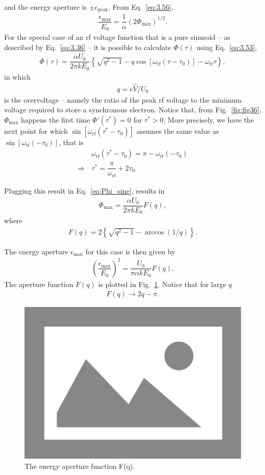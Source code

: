  and the energy aperture is $\pm\epsilon_\text{peak}$. From Eq.~\eqref{eq:3.56},
\begin{align}
	\dfrac{\epsilon_{\max}}{E_0} = \dfrac{1}{\alpha} (2 \Phi_{\max})^{1/2}.
\end{align}
For the special case of an rf voltage function that is a pure sinusoid -- as described by Eq.~\eqref{eq:3.36} -- it is possible to calculate $\Phi(\tau)$ using Eq.~\eqref{eq:3.53},
\begin{align}\label{eq:Phi_sine}
	\Phi(\tau) = \dfrac{\alpha U_0}{2\pi k E_0} \left\lbrace \sqrt{q^2-1} - q \cos [\omega_{\text{rf}}(\tau - \tau_0)] - \omega_{\text{rf}} \tau \right\rbrace,
\end{align}
in which 
\begin{align} \label{eq:3.60}
q = e\hat{V}/U_0
\end{align}
is the overvoltage -- namely the ratio of the peak rf voltage to the minimum voltage required to store a synchronous electron. Notice that, from Fig.~\ref{fig:fig36}, $\Phi_{\max}$ happens the first time $\Phi'(\tau^*) = 0$ for $\tau^* > 0$. More precisely, we have the next point for which $\sin[\omega_{\text{rf}}(\tau^*-\tau_0)]$ assumes the same value as $\sin[\omega_{\text{rf}}(-\tau_0)]$, that is
\begin{align*}
	& \omega_{\text{rf}}(\tau^* - \tau_0) = \pi - \omega_{\text{rf}}(-\tau_0) \\
    \Rightarrow \, & \tau^* = \dfrac{\pi}{\omega_{\text{rf}}} + 2\tau_0.
\end{align*}

Plugging this result in Eq.~\eqref{eq:Phi_sine}, results in
\begin{align} \label{eq:3.58}
	\Phi_{\max} = \dfrac{\alpha U_0}{2\pi k E_0} F(q),
\end{align}
where
\begin{align}
	F(q) = 2\left\lbrace \sqrt{q^2 - 1} - \arccos(1/q) \right\rbrace.
\end{align}

The energy aperture $\epsilon_{\max}$ for this case is then given by
\begin{align}
	\left(\dfrac{\epsilon_{\max}}{E_0}\right)^2 = \dfrac{U_0}{\pi \alpha k E_0} F(q).
\end{align}
The aperture function $F(q)$ is plotted in Fig.~\ref{fig:fig38}. Notice that for large $q$
\begin{align}
	F(q) \to 2q - \pi.
\end{align}

\begin{figure}[!htb]
	\centering
	\includegraphics[width=0.5\linewidth]{./Figuras/placeholder.png}
	\caption{The energy aperture function F(q).}
	\label{fig:fig38}
\end{figure}

